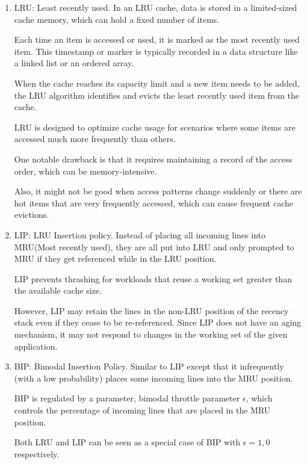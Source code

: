 \documentclass[letterpaper,12pt]{article}
\begin{document}
\begin{enumerate}
    \item LRU: Least recently used.
          In an LRU cache, data is stored in a limited-sized cache memory, which can hold a fixed number of items.

          Each time an item is accessed or used, it is marked as the most recently used item. This timestamp or marker is typically recorded in a data structure like a linked list or an ordered array.

          When the cache reaches its capacity limit and a new item needs to be added, the LRU algorithm identifies and evicts the least recently used item from the cache.

          LRU is designed to optimize cache usage for scenarios where some items are accessed much more frequently than others.

          One notable drawback is that it requires maintaining a record of the access order, which can be memory-intensive.

          Also, it might not be good when access patterns change suddenly or there are hot items that are very frequently accessed, which can cause frequent cache evictions.

    \item LIP: LRU Insertion policy.
          Instead of placing all incoming lines into MRU(Most recently used), they are all put into LRU and only prompted to MRU if they get referenced while in the LRU position.

          LIP prevents thrashing for workloads that reuse a working set greater than the available cache size.

          However, LIP may retain the lines in the non-LRU position of the recency stack even if they cease to be re-referenced. Since LIP does not have an aging mechanism, it may not respond to changes in the working set of the given application.

    \item BIP: Bimodal Insertion Policy.
          Similar to LIP except that it infrequently (with a low probability) places some incoming lines into the MRU position.

          BIP is regulated by a parameter, bimodal throttle parameter $\epsilon$, which controls the percentage of incoming lines that are placed in the MRU position.

          Both LRU and LIP can be seen as a special case of BIP with $\epsilon = 1,0$ respectively.


\end{enumerate}
\end{document}
